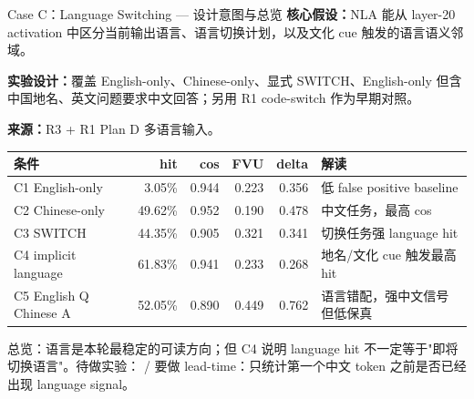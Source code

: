 
\footnotesize

\begin{frame}{Case C：Language Switching — 设计意图与总览}
\scriptsize
\textbf{核心假设：}NLA 能从 layer-20 activation 中区分当前输出语言、语言切换计划，以及文化 cue 触发的语言语义邻域。

\textbf{实验设计：}覆盖 English-only、Chinese-only、显式 SWITCH、English-only 但含中国地名、英文问题要求中文回答；另用 R1 code-switch 作为早期对照。

\textbf{来源：}R3  + R1 Plan D 多语言输入。

\vspace{0.25em}
\begin{tabularx}{\linewidth}{lrrrrX}
\toprule
条件 & hit & cos & FVU & delta & 解读 \\
\midrule
C1 English-only & 3.05\% & 0.944 & 0.223 & 0.356 & 低 false positive baseline \\
C2 Chinese-only & 49.62\% & 0.952 & 0.190 & 0.478 & 中文任务，最高 cos \\
C3 SWITCH & 44.35\% & 0.905 & 0.321 & 0.341 & 切换任务强 language hit \\
C4 implicit language & 61.83\% & 0.941 & 0.233 & 0.268 & 地名/文化 cue 触发最高 hit \\
C5 English Q Chinese A & 52.05\% & 0.890 & 0.449 & 0.762 & 语言错配，强中文信号但低保真 \\
\bottomrule
\end{tabularx}

\vspace{0.3em}
\alert{总览：}语言是本轮最稳定的可读方向；但 C4 说明 language hit 不一定等于"即将切换语言"。待做实验： /  要做 lead-time：只统计第一个中文 token 之前是否已经出现 language signal。
\end{frame}

